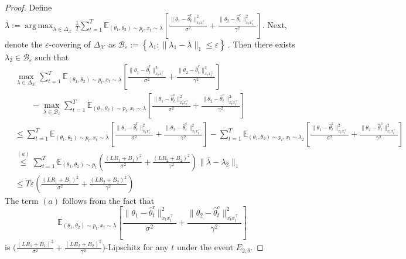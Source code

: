 \documentclass[accepted]{uai2025} %
\theoremstyle{plain}
\theoremstyle{definition}
\theoremstyle{remark}
\DeclareMathOperator*{\argmax}{arg\,max}
\newcommand{\hthetact}{\hat{\theta}_t^{\mathrm{c}}}
\newcommand{\hthetart}{\hat{\theta}_t^{\mathrm{r}}}
\newcommand{\cbr}[1]{\left\{#1\right\}}
\begin{document}
\begin{proof}
Define $\overline{\lambda}:=\argmax_{\lambda \in \Delta_{\mathcal{X}}} \frac{1}{T} 
\sum_{t=1}^{T} \mathbb{E}_{(\theta_1, \theta_2) \sim p_t, x_t\sim \lambda} 
\left[ \frac{\|\theta_1 - \hthetart\|_{x_t x_t^\top}^2}{\sigma^2} 
+ \frac{\|\theta_2 - \hthetact\|_{x_t x_t^\top}^2}{\gamma^2} \right] $. Next, denote the $\varepsilon$-covering of $\Delta_{\mathcal{X}}$ as $\mathcal{B}_{\varepsilon}:=\cbr{\lambda_1 : \lVert \lambda_1-\overline{\lambda} \rVert_1\le \varepsilon}~.$
Then there exists $\lambda_2\in\mathcal{B}_\varepsilon$ such that %
\begin{align*}
    &\max_{\lambda \in \Delta_{\mathcal{X}}}  
\sum_{t=1}^{T} \mathbb{E}_{(\theta_1, \theta_2) \sim p_t, x_t\sim \lambda} 
\left[ \frac{\|\theta_1 - \hthetart\|_{x_t x_t^\top}^2}{\sigma^2} 
+ \frac{\|\theta_2 - \hthetact\|_{x_t x_t^\top}^2}{\gamma^2} \right] \\
&\qquad- \max_{\lambda \in \mathcal{B}_\varepsilon}  
\sum_{t=1}^{T} \mathbb{E}_{(\theta_1, \theta_2) \sim p_t, x_t\sim \lambda} 
\left[ \frac{\|\theta_1 - \hthetart\|_{x_t x_t^\top}^2}{\sigma^2} 
+ \frac{\|\theta_2 - \hthetact\|_{x_t x_t^\top}^2}{\gamma^2} \right]
\\
&\le\sum_{t=1}^{T} \mathbb{E}_{(\theta_1, \theta_2) \sim p_t, x_t\sim \overline{\lambda}} 
\left[ \frac{\|\theta_1 - \hthetart\|_{x_t x_t^\top}^2}{\sigma^2} 
+ \frac{\|\theta_2 - \hthetact\|_{x_t x_t^\top}^2}{\gamma^2}  \right]-\sum_{t=1}^{T} \mathbb{E}_{(\theta_1, \theta_2) \sim p_t, x_t\sim \lambda_2} 
\left[ \frac{\|\theta_1 - \hthetart\|_{x_t x_t^\top}^2}{\sigma^2} 
+ \frac{\|\theta_2 - \hthetact\|_{x_t x_t^\top}^2}{\gamma^2}\right]
\\&\stackrel{(a)}{\le} \sum_{t=1}^T \mathbb{E}_{(\theta_1, \theta_2) \sim p_t} \left(\frac{(LR_1+B_1)^2}{\sigma^2}+\frac{(LR_2+B_2)^2}{\gamma^2}\right)\lVert\overline{\lambda}-\lambda_2 \rVert_1 
\\&\le T\varepsilon \left(\frac{(LR_1+B_1)^2}{\sigma^2}+\frac{(LR_2+B_2)^2}{\gamma^2}\right)
\end{align*}
The term $(a)$ follows from the fact that 
\[
\mathbb{E}_{(\theta_1, \theta_2) \sim p_t, x_t \sim \lambda} \left[ \frac{\|\theta_1 - \hat{\theta}_t^{\mathrm{r}}\|_{x_t x_t^\top}^2}{\sigma^2} + \frac{\|\theta_2 - \hat{\theta}_t^{\mathrm{c}}\|_{x_t x_t^\top}^2}{\gamma^2} \right]
\]
is \( \Big(\frac{(LR_1 + B_1)^2}{\sigma^2} + \frac{(LR_2 + B_2)^2}{\gamma^2} \Big)\)-Lipschitz  for any \( t \) under the event \( E_{2, \delta} \).


\end{proof}
\end{document}
